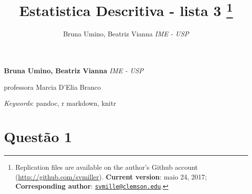 \documentclass[11pt,]{article}
\title{Estatistica Descritiva - lista 3 \thanks{Replication files are available on the author's Github account
(\url{http://github.com/svmiller}). \textbf{Current version}: maio 24,
2017; \textbf{Corresponding author}:
\href{mailto:svmille@clemson.edu}{\nolinkurl{svmille@clemson.edu}}.}  }
\author{\Large Bruna Umino, Beatriz Vianna\vspace{0.05in} \newline\normalsize\emph{IME - USP}  }
\date{}
\newcommand*{\authorfont}{\fontfamily{phv}\selectfont}
\renewenvironment{abstract}
 {{%
    \setlength{\leftmargin}{0mm}
    \setlength{\rightmargin}{\leftmargin}%
  }%
  \relax}
 {\endlist}
\begin{document}
	
%

{%
\setlength{\parindent}{0pt}
\thispagestyle{plain}
{\fontsize{18}{20}\selectfont\raggedright 
\maketitle  %

}

{
   \vskip 13.5pt\relax \normalsize\fontsize{11}{12} 
\textbf{\authorfont Bruna Umino, Beatriz Vianna} \hskip 15pt \emph{\small IME - USP}   

}

}







\begin{abstract}

    \hbox{\vrule height .2pt width 39.14pc}

    \vskip 8.5pt %

\noindent professora Marcia D'Elia Branco


\vskip 8.5pt \noindent \emph{Keywords}: pandoc, r markdown, knitr \par

    \hbox{\vrule height .2pt width 39.14pc}



\end{abstract}


\vskip 6.5pt

\noindent  \section{Questão 1}\label{questao-1}
\end{document}
